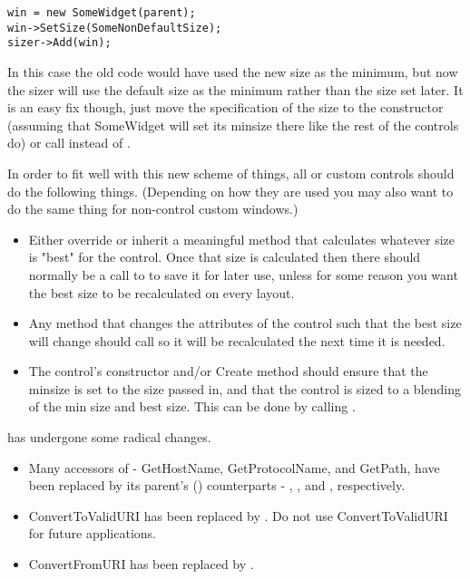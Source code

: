 \begin{verbatim}
win = new SomeWidget(parent);
win->SetSize(SomeNonDefaultSize);
sizer->Add(win);
\end{verbatim}

  In this case the old code would have used the new size as the
  minimum, but now the sizer will use the default size as the minimum
  rather than the size set later.  It is an easy fix though, just move
  the specification of the size to the constructor (assuming that
  SomeWidget will set its minsize there like the rest of the controls
  do) or call  instead of .

  In order to fit well with this new scheme of things, all 
  or custom controls should do the following things.  (Depending on
  how they are used you may also want to do the same thing for
  non-control custom windows.)

\begin{itemize}\itemsep=0pt
\item Either override or inherit a meaningful  method
      that calculates whatever size is "best" for the control.  Once
      that size is calculated then there should normally be a call to
       to save it for later use, unless for some reason
      you want the best size to be recalculated on every layout.

\item Any method that changes the attributes of the control such that
      the best size will change should call  so it
      will be recalculated the next time it is needed.

\item The control's constructor and/or Create method should ensure
      that the minsize is set to the size passed in, and that the
      control is sized to a blending of the min size and best size.
      This can be done by calling .
\end{itemize}



 has undergone some radical changes.

\begin{itemize}\itemsep=0pt
\item Many accessors of  - GetHostName, GetProtocolName, and GetPath,
      have been replaced by its parent's () counterparts - ,
      , and , respectively.

\item ConvertToValidURI has been replaced by .  Do not use
      ConvertToValidURI for future applications.

\item ConvertFromURI has been replaced by .
\end{itemize}


